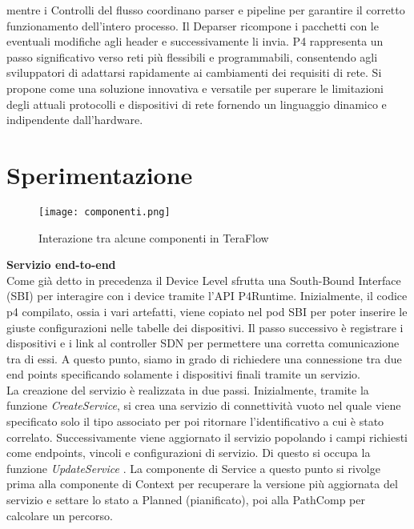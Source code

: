 mentre
i Controlli del flusso coordinano parser e pipeline per garantire il corretto funzionamento dell'intero processo.
Il Deparser ricompone i pacchetti con le eventuali modifiche agli header e successivamente li invia.
P4 rappresenta un passo significativo verso reti più flessibili e programmabili, consentendo agli sviluppatori di adattarsi rapidamente ai cambiamenti dei requisiti di rete.
Si propone come una soluzione innovativa e versatile per superare le limitazioni degli attuali protocolli e dispositivi di rete fornendo un linguaggio dinamico e indipendente dall'hardware.

\section{Sperimentazione}
\begin{figure}[h]
    \centering
   \texttt{[image: componenti.png]}
    \caption{Interazione tra alcune componenti in TeraFlow}
    \label{fig:componenti}
\end{figure}
\textbf{Servizio end-to-end}
\\Come già detto in precedenza il Device Level sfrutta una South-Bound Interface (SBI) per interagire con i device tramite l'API P4Runtime. 
Inizialmente, il codice p4 compilato, ossia i vari artefatti, viene copiato nel pod SBI per poter inserire le giuste configurazioni nelle tabelle dei dispositivi.
Il passo successivo è registrare i dispositivi e i link al controller SDN per permettere una corretta comunicazione tra di essi.
A questo punto, siamo in grado di richiedere una connessione tra due end points specificando solamente i dispositivi finali tramite un servizio.
\\La creazione del servizio è realizzata in due passi. 
Inizialmente, tramite la funzione \textit{CreateService}, si crea una servizio di connettività vuoto nel quale viene specificato solo il tipo associato per poi ritornare l'identificativo a cui è stato correlato.
Successivamente viene aggiornato il servizio popolando i campi richiesti come endpoints, vincoli e configurazioni di servizio. Di questo si occupa la funzione \textit{UpdateService} \cite{D32}.
La componente di Service a questo punto si rivolge prima alla componente di Context per recuperare la versione più aggiornata del servizio e settare lo stato a Planned (pianificato), poi alla PathComp per calcolare un percorso.
